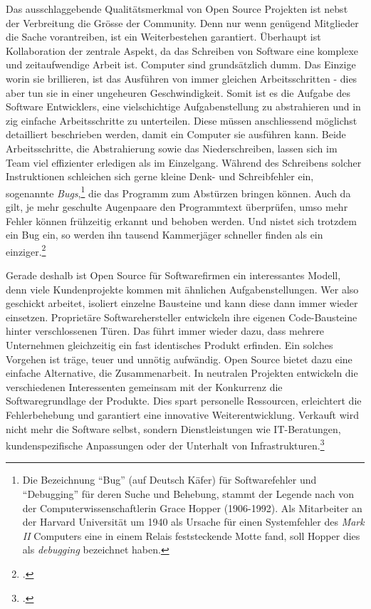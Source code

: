 \documentclass[
paper=164mm:234mm, %
pagesize, %
DIV=calc, %
10pt, %
BCOR=0mm, %
parskip=half- %
]{scrbook}
\begin{document}
Das ausschlaggebende Qualitätsmerkmal von Open Source Projekten ist nebst der Verbreitung die Grösse der Community. Denn nur wenn genügend Mitglieder die Sache vorantreiben, ist ein Weiterbestehen garantiert. Überhaupt ist Kollaboration der zentrale Aspekt, da das Schreiben von Software eine komplexe und zeitaufwendige Arbeit ist. Computer sind grundsätzlich dumm. Das Einzige worin sie brillieren, ist das Ausführen von immer gleichen Arbeitsschritten - dies aber tun sie in einer ungeheuren Geschwindigkeit. Somit ist es die Aufgabe des Software Entwicklers, eine vielschichtige Aufgabenstellung zu abstrahieren und in zig einfache Arbeitsschritte zu unterteilen. Diese müssen anschliessend möglichst detailliert beschrieben werden, damit ein Computer sie ausführen kann. Beide Arbeitsschritte, die Abstrahierung sowie das Niederschreiben, lassen sich im Team viel effizienter erledigen als im Einzelgang. Während des Schreibens solcher Instruktionen schleichen sich gerne kleine Denk- und Schreibfehler ein, sogenannte \emph{Bugs},\footnote{Die Bezeichnung \enquote{Bug} (auf Deutsch Käfer) für Softwarefehler und \enquote{Debugging} für deren Suche und Behebung, stammt der Legende nach von der Computerwissenschaftlerin Grace Hopper (1906-1992). Als Mitarbeiter an der Harvard Universität um 1940 als Ursache für einen Systemfehler des \emph{Mark II} Computers eine in einem Relais feststeckende Motte fand, soll Hopper dies als \emph{debugging} bezeichnet haben.} die das Programm zum Abstürzen bringen können. Auch da gilt, je mehr geschulte Augenpaare den Programmtext überprüfen, umso mehr Fehler können frühzeitig erkannt und behoben werden. Und nistet sich trotzdem ein Bug ein, so werden ihn tausend Kammerjäger schneller finden als ein einziger.\footnote{\cite[235-254]{Grassmuck:2004}.}

Gerade deshalb ist Open Source für Softwarefirmen ein interessantes Modell, denn viele Kundenprojekte kommen mit ähnlichen Aufgabenstellungen. Wer also geschickt arbeitet, isoliert einzelne Bausteine und kann diese dann immer wieder einsetzen. Proprietäre Softwarehersteller entwickeln ihre eigenen Code-Bausteine hinter verschlossenen Türen. Das führt immer wieder dazu, dass mehrere Unternehmen gleichzeitig ein fast identisches Produkt erfinden. Ein solches Vorgehen ist träge, teuer und unnötig aufwändig. Open Source bietet dazu eine einfache Alternative, die Zusammenarbeit. In neutralen Projekten entwickeln die verschiedenen Interessenten gemeinsam mit der Konkurrenz die Softwaregrundlage der Produkte. Dies spart personelle Ressourcen, erleichtert die Fehlerbehebung und garantiert eine innovative Weiterentwicklung. Verkauft wird nicht mehr die Software selbst, sondern Dienstleistungen wie IT-Beratungen, kundenspezifische Anpassungen oder der Unterhalt von Infrastrukturen.\footnote{\cite[329-357]{Grassmuck:2004}.}
\end{document}
